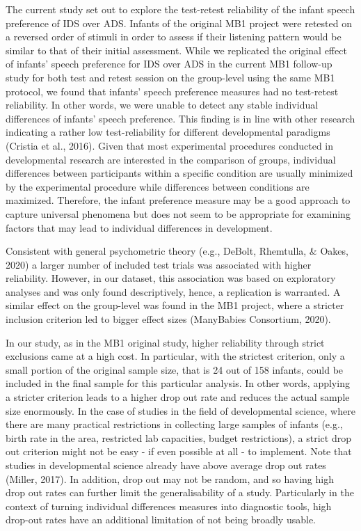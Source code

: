 \documentclass[
  man,floatsintext]{apa6}
\begin{document}
The current study set out to explore the test-retest reliability of the infant speech preference of IDS over ADS. Infants of the original MB1 project were retested on a reversed order of stimuli in order to assess if their listening pattern would be similar to that of their initial assessment. While we replicated the original effect of infants' speech preference for IDS over ADS in the current MB1 follow-up study for both test and retest session on the group-level using the same MB1 protocol, we found that infants' speech preference measures had no test-retest reliability. In other words, we were unable to detect any stable individual differences of infants' speech preference. This finding is in line with other research indicating a rather low test-reliability for different developmental paradigms (Cristia et al., 2016). Given that most experimental procedures conducted in developmental research are interested in the comparison of groups, individual differences between participants within a specific condition are usually minimized by the experimental procedure while differences between conditions are maximized. Therefore, the infant preference measure may be a good approach to capture universal phenomena but does not seem to be appropriate for examining factors that may lead to individual differences in development.

Consistent with general psychometric theory (e.g., DeBolt, Rhemtulla, \& Oakes, 2020) a larger number of included test trials was associated with higher reliability. However, in our dataset, this association was based on exploratory analyses and was only found descriptively, hence, a replication is warranted. A similar effect on the group-level was found in the MB1 project, where a stricter inclusion criterion led to bigger effect sizes (ManyBabies Consortium, 2020).

In our study, as in the MB1 original study, higher reliability through strict exclusions came at a high cost. In particular, with the strictest criterion, only a small portion of the original sample size, that is 24 out of 158 infants, could be included in the final sample for this particular analysis. In other words, applying a stricter criterion leads to a higher drop out rate and reduces the actual sample size enormously. In the case of studies in the field of developmental science, where there are many practical restrictions in collecting large samples of infants (e.g., birth rate in the area, restricted lab capacities, budget restrictions), a strict drop out criterion might not be easy - if even possible at all - to implement. Note that studies in developmental science already have above average drop out rates (Miller, 2017). In addition, drop out may not be random, and so having high drop out rates can further limit the generalisability of a study. Particularly in the context of turning individual differences measures into diagnostic tools, high drop-out rates have an additional limitation of not being broadly usable.
\end{document}
